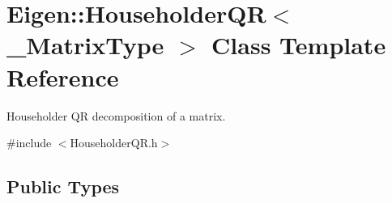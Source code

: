 \hypertarget{class_eigen_1_1_householder_q_r}{}\section{Eigen\+::Householder\+QR$<$ \+\_\+\+Matrix\+Type $>$ Class Template Reference}
\label{class_eigen_1_1_householder_q_r}


Householder QR decomposition of a matrix.  




{\ttfamily \#include $<$Householder\+Q\+R.\+h$>$}

\subsection*{Public Types}
